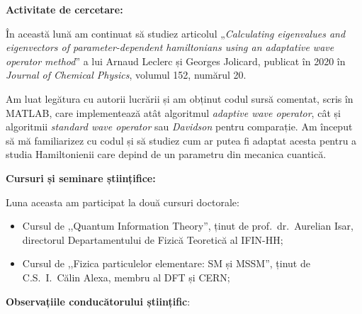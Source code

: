 
\makereportpreamble

\textbf{Activitate de cercetare:}

În această lună am continuat să studiez articolul „\emph{Calculating eigenvalues and eigenvectors of parameter-dependent hamiltonians using an adaptative wave operator method}” a lui Arnaud Leclerc și Georges Jolicard, publicat în 2020 în \emph{Journal of Chemical Physics}, volumul 152, numărul 20.

Am luat legătura cu autorii lucrării și am obținut codul sursă comentat, scris în MATLAB, care implementează atât algoritmul \emph{adaptive wave operator}, cât și algoritmii \emph{standard wave operator} sau \emph{Davidson} pentru comparație. Am început să mă familiarizez cu codul și să studiez cum ar putea fi adaptat acesta pentru a studia Hamiltonienii care depind de un parametru din mecanica cuantică.

\vspace{0.5em}

\textbf{Cursuri și seminare științifice:}

Luna aceasta am participat la două cursuri doctorale:
\begin{itemize}
    \item Cursul de ,,Quantum Information Theory'', ținut de prof.~dr.~Aurelian Isar, directorul Departamentului de Fizică Teoretică al IFIN-HH;

    \item Cursul de ,,Fizica particulelor elementare: SM și MSSM'', ținut de C.S.~I.~Călin Alexa, membru al DFT și CERN;
\end{itemize}

\vspace{0.5em}

\textbf{Observațiile conducătorului științific}:

\vspace{3em}

